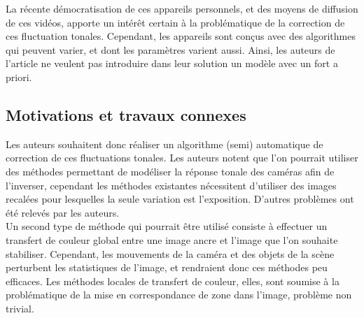 La récente démocratisation de ces appareils personnels, et des moyens de diffusion de ces vidéos, apporte un intérêt certain à la problématique de la correction de ces fluctuation tonales. Cependant, les appareils sont conçus avec des algorithmes qui peuvent varier, et dont les paramètres varient aussi. Ainsi, les auteurs de l'article ne veulent pas introduire dans leur solution un modèle avec un fort a priori.\\

\subsection{Motivations et travaux connexes}
Les auteurs souhaitent donc réaliser un algorithme (semi) automatique de correction de ces fluctuations tonales. Les auteurs notent que l'on pourrait utiliser des méthodes permettant de modéliser la réponse tonale des caméras afin de l'inverser, cependant les méthodes existantes nécessitent d'utiliser des images recalées pour lesquelles la seule variation est l'exposition. D'autres problèmes ont été relevés par les auteurs.\\

Un second type de méthode qui pourrait être utilisé consiste à effectuer un transfert de couleur global entre une image ancre et l'image que l'on souhaite stabiliser. Cependant, les mouvements de la caméra et des objets de la scène perturbent les statistiques de l'image, et rendraient donc ces méthodes peu efficaces. Les méthodes locales de transfert de couleur, elles, sont soumise à la problématique de la mise en correspondance de zone dans l'image, problème non trivial.\\

